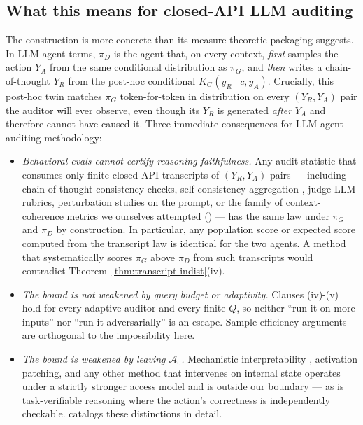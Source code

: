 \documentclass{article}
\theoremstyle{plain}
\theoremstyle{definition}
\theoremstyle{remark}
\begin{document}
\subsection{What this means for closed-API LLM auditing}\label{sec:thm-1-implications}

The construction is more concrete than its measure-theoretic packaging
suggests. In LLM-agent terms, $\pi_D$ is the agent that, on every context,
\emph{first} samples the action $Y_A$ from the same conditional distribution
as $\pi_G$, and \emph{then} writes a chain-of-thought $Y_R$ from the
post-hoc conditional $K_G(y_R \mid c, y_A)$. Crucially, this post-hoc twin
matches $\pi_G$ token-for-token in distribution on every $(Y_R, Y_A)$ pair
the auditor will ever observe, even though its $Y_R$ is generated
\emph{after} $Y_A$ and therefore cannot have caused it. Three immediate
consequences for LLM-agent auditing methodology:

\begin{itemize}
  \item \emph{Behavioral evals cannot certify reasoning faithfulness.}
  Any audit statistic that consumes only finite closed-API transcripts of
  $(Y_R, Y_A)$ pairs --- including chain-of-thought consistency checks,
  self-consistency aggregation \citep{wang2022selfconsistency}, judge-LLM
  rubrics, perturbation studies on the prompt, or the family of
  context-coherence metrics we ourselves attempted
  () --- has the same law under $\pi_G$ and $\pi_D$
  by construction. In particular, any population score or expected score
  computed from the transcript law is identical for the two agents. A
  method that systematically scores $\pi_G$ above $\pi_D$ from such
  transcripts would contradict Theorem~\ref{thm:transcript-indist}(iv).
  \item \emph{The bound is not weakened by query budget or adaptivity.}
  Clauses (iv)-(v) hold for every adaptive auditor and every finite $Q$,
  so neither ``run it on more inputs'' nor ``run it adversarially'' is an
  escape. Sample efficiency arguments are orthogonal to the impossibility
  here.
  \item \emph{The bound \emph{is} weakened by leaving $\mathcal A_0$.}
  Mechanistic interpretability \citep{geiger2022inducing,geiger2023causal},
  activation patching, and any other method that intervenes on internal
  state operates under a strictly stronger access model and is outside our
  boundary --- as is task-verifiable reasoning where the action's
  correctness is independently checkable.  catalogs
  these distinctions in detail.
\end{itemize}
\end{document}
